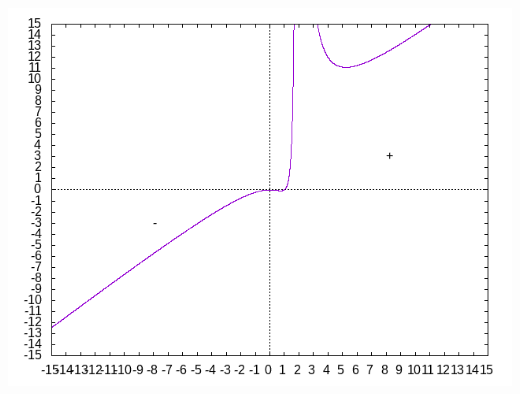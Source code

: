 \documentclass[11pt]{scrartcl}
\begin{document}
	\begin{center}
		\includegraphics[scale=0.6]{funkcja2}
	\end{center}
\end{document}

